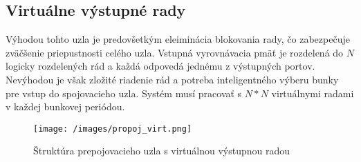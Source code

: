 \subsection{Virtuálne výstupné rady}
Výhodou tohto uzla je predovšetkým eleiminácia blokovania rady, čo zabezpečuje zväčšenie priepustnosti celého uzla. Vstupná vyrovnávacia pmäť je rozdelená do $N$ logicky rozdelených rád a každá odpovedá jednému z výstupných portov. Nevýhodou je však zložité riadenie rád a potreba inteligentného výberu bunky pre vstup do spojovacieho uzla. Systém musí pracovať s $N*N$ virtuálnymi radami v každej bunkovej periódou.

\begin{figure}[ht]
\centering
  \begin{center}
    \texttt{[image: /images/propoj\_virt.png]}
  \end{center}
  \caption[Štruktúra prepojovacieho uzla s virtuálnou výstupnou radou]{Štruktúra prepojovacieho uzla s virtuálnou výstupnou radou}
\end{figure}